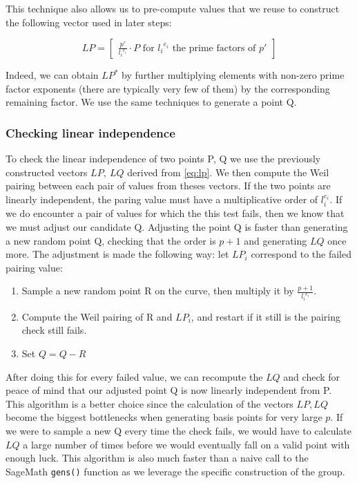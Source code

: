 \documentclass[a4paper,11pt,oneside]{report}
\begin{document}
        This technique also allows us to pre-compute values that we reuse to construct the following vector used in later steps:

        \begin{displaymath}
         \label{eq:lp}
             LP = \begin{bmatrix}\frac{p'}{{l_i}^{e_i}} \cdot P \textrm{  for } {l_i}^{e_i} \textrm{ the prime factors of } p'\end{bmatrix} 
         \end{displaymath}

         Indeed, we can obtain $LP^*$ by further multiplying elements with non-zero prime factor exponents (there are typically very few of them) by the corresponding remaining factor. We use the same techniques to generate a point Q.


        \subsubsection{Checking linear independence}

        To check the linear independence of two points P, Q we use the previously constructed vectors $LP,\: LQ$ derived from \autoref{eq:lp}. We then compute the Weil pairing between each pair of values from theses vectors. If the two points are linearly independent, the paring value must have a multiplicative order of $l_i^{e_i}$. If we do encounter a pair of values for which the this test fails, then we know that we must adjust our candidate Q. Adjusting the point Q is faster than generating a new random point Q, checking that the order is $p+1$ and generating $LQ$ once more. 
        The adjustment is made the following way: let $LP_i$ correspond to the failed pairing value:

        \begin{enumerate}
            \item Sample a new random point R on the curve, then multiply it by $\frac{p+1}{{l_i}^{e_i}}$.
            \item Compute the Weil pairing of R and $LP_i$, and restart if it still is the pairing check still fails.
            \item Set $Q=Q-R$
        \end{enumerate}

        After doing this for every failed value, we can recompute the $LQ$ and check for peace of mind that our adjusted point Q is now linearly independent from P. This algorithm is a better choice since the calculation of the vectors $LP, LQ$ become the biggest bottlenecks when generating basis points for very large $p$. If we were to sample a new Q every time the check fails, we would have to calculate $LQ$ a large number of times before we would eventually fall on a valid point with enough luck. This algorithm is also much faster than a naive call to the SageMath \texttt{gens()} function as we leverage the specific construction of the group.
        
\end{document}
